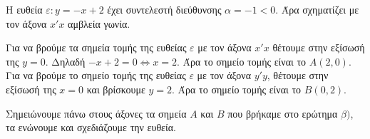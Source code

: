 
\begin{alist}
\item Η ευθεία $\varepsilon: y = -x + 2$ έχει συντελεστή διεύθυνσης $\alpha = -1 < 0$. Άρα σχηματίζει με τον
άξονα $x'x$ αμβλεία γωνία.

\item Για να βρούμε τα σημεία τομής της ευθείας $\varepsilon$ με τον άξονα $x'x$ θέτουμε στην εξίσωσή της
$y = 0$. Δηλαδή $-x + 2 = 0 \Leftrightarrow x = 2$. Άρα το σημείο τομής είναι το $A(2, 0)$.
Για να βρούμε το σημείο τομής της ευθείας $\varepsilon$ με τον άξονα $y'y$, θέτουμε στην εξίσωσή της
$x = 0$ και βρίσκουμε $y = 2$. Άρα το σημείο τομής είναι το $B(0, 2)$.

\item Σημειώνουμε πάνω στους άξονες τα σημεία $A$ και $B$ που βρήκαμε στο ερώτημα $\beta)$, τα
ενώνουμε και σχεδιάζουμε την ευθεία.
\end{alist}

